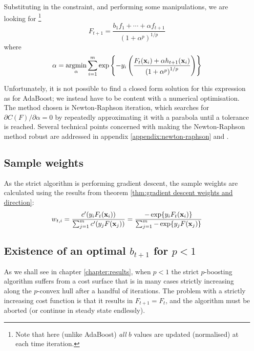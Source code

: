 Substituting in the constraint, and performing some manipulations, we
are looking for%
\footnote{Note that here (unlike AdaBoost) \emph{all} $b$ values are updated
(normalised) at each time iteration.}
%
\begin{equation}
F_{t+1} = \frac{b_1 f_1 + \cdots + \alpha f_{t+1}}{\left( 1 + \alpha^p
\right) ^ {1/p}}
\end{equation}
%
where
%
\begin{equation}
\alpha = \argmin_{\alpha} \sum_{i=1}^{m} \exp \left\{ -y_i \left(
\frac{F_{t}(\bfx_i) + \alpha h_{t+1}(\bfx_i)}{\left( 1 + \alpha ^p
\right) ^{1/p}} \right) \right\}
\label{eqn:strict minimise function}
\end{equation}

Unfortunately, it is not possible to find a closed form solution for
this expression as for AdaBoost; we instead have to be content with a
numerical optimisation.  The method chosen is Newton-Raphson
iteration, which searches for $\partial C(F) / \partial \alpha = 0$ by
repeatedly approximating it with a parabola until a tolerance is
reached.  Several technical points concerned with making the
Newton-Raphson method robust are addressed in appendix
\ref{appendix:newton-raphson} and \cite{Heath97}.

\subsection{Sample weights}

As the strict algorithm is performing gradient descent, the sample
weights are calculated using the results from theorem
\ref{thm:gradient descent weights and direction}:
%
\begin{equation}
w_{t,i} = \frac{c'(y_i F_t (\mathbf{x}_i))}{\sum_{j=1}^{m} c'(y_j
F(\mathbf{x}_j))} = \frac{- \exp \{ y_i F_t (\mathbf{x}_i)\}}{\sum_{j=1}^{m} -
\exp \{y_j F(\mathbf{x}_j)\}}
\end{equation}

\subsection{Existence of an optimal $b_{t+1}$ for $p < 1$}

As we shall see in chapter \ref{chapter:results}, when $p < 1$ the
strict $p$-boosting algorithm suffers from a cost surface that is in
many cases strictly increasing along the $p$-convex hull after a
handful of iterations.  The problem with a strictly increasing cost
function is that it results in $F_{t+1} = F_t$, and the algorithm must
be aborted (or continue in steady state endlessly).

